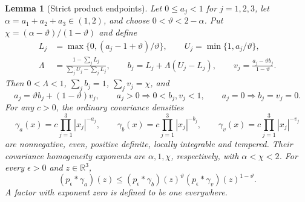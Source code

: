 \documentclass[12pt,oneside,openany]{book}
\makeatletter
\let\lean@pending\@empty
\newcommand{\LeanMarker}[1]{\gdef\lean@pending{#1}}
\numberwithin{equation}{section}
\newtheorem{lemma}[theorem]{Lemma}
\theoremstyle{nogostyle}
\theoremstyle{definition}
\newcommand{\R}{\mathbb{R}}
\makeatother
\begin{document}
\LeanMarker{L:product-endpoints}
\begin{lemma}[Strict product endpoints]\label{L:product-endpoints}
  Let $0 \le a_j < 1$ for $j = 1,2,3$, let $\alpha = a_1+a_2+a_3 \in (1,2)$, and
  choose $0 < \vartheta < 2-\alpha$. Put $\chi =
  (\alpha-\vartheta)/(1-\vartheta)$ and define
  \begin{equation}\label{E:product-endpoint-vectors}
    \begin{split}
      L_j&=\max\{0,(a_j-1+\vartheta)/\vartheta\},\qquad
      U_j=\min\{1,a_j/\vartheta\},\\
      \Lambda&=\frac{1-\sum_jL_j}{\sum_jU_j-\sum_jL_j},\qquad
      b_j=L_j+\Lambda(U_j-L_j),\qquad
      v_j=\frac{a_j-\vartheta b_j}{1-\vartheta}.
    \end{split}
  \end{equation}
  Then $0 < \Lambda < 1$, $\sum_j b_j = 1$, $\sum_jv_j = \chi$, and
  \[
    a_j=\vartheta b_j+(1-\vartheta)v_j,\qquad
    a_j>0\Longrightarrow 0<b_j,v_j<1,\qquad
    a_j=0\Longrightarrow b_j=v_j=0.
  \]
  For any $c > 0$, the ordinary covariance densities
  \[
    \gamma_a(x)=c\prod_{j=1}^3|x_j|^{-a_j},\qquad
    \gamma_b(x)=c\prod_{j=1}^3|x_j|^{-b_j},\qquad
    \gamma_v(x)=c\prod_{j=1}^3|x_j|^{-v_j}
  \]
  are nonnegative, even, positive definite, locally integrable and tempered.
  Their covariance homogeneity exponents are $\alpha,1,\chi$, respectively, with
  $\alpha < \chi < 2$. For every $\epsilon > 0$ and $z \in \R^3$,
  \begin{equation}\label{E:product-gaussian-comparison}
    (p_\epsilon*\gamma_a)(z)
    \le(p_\epsilon*\gamma_b)(z)^\vartheta
    (p_\epsilon*\gamma_v)(z)^{1-\vartheta}.
  \end{equation}
  A factor with exponent zero is defined to be one everywhere.
\end{lemma}
\end{document}
